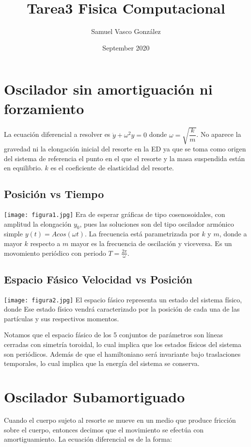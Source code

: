 \documentclass{article}
\title{Tarea3 Fisica Computacional}
\author{Samuel Vasco González}
\date{September 2020}
\begin{document}
\maketitle

\section{Oscilador sin amortiguación ni forzamiento}
\medskip
La ecuación diferencial a resolver es $\ddot{y} + \omega^2 y =0$ donde $\omega=\sqrt{\dfrac{k}{m}}$. No aparece la gravedad ni la elongación inicial del resorte en la ED ya que se toma como origen del sistema de referencia el punto en el que el resorte y la masa suspendida están en equilibrio.
$k$ es el coeficiente de elasticidad del resorte.
\medskip

\subsection{Posición vs Tiempo}
\texttt{[image: figura1.jpg]}
\medskip
Era de esperar gráficas de tipo cosenosoidales, con amplitud la elongación $y_0$, pues las soluciones son del tipo oscilador armónico simple $y(t)=Acos(\omega t)$. La frecuencia está parametrizada por $k$ y $m$, donde a mayor $k$ respecto a $m$ mayor es la frecuencia de oscilación y viceversa. Es un movomiento periódico con periodo $T=\frac{2\pi}{\omega}$. 
\medskip
\subsection{Espacio Fásico Velocidad vs Posición}
\texttt{[image: figura2.jpg]}
\medskip
El espacio fásico representa un estado del sistema físico, donde Ese estado físico vendrá caracterizado por la posición de cada una de las partículas y sus respectivos momentos.

Notamos que el espacio fásico de los 5 conjuntos de parámetros son líneas cerradas con simetría toroidal, lo cual implica que los estados físicos del sistema son periódicos. Además de que el hamiltoniano será invariante bajo traslaciones temporales, lo cual implica que la energía del sistema se conserva.
\medskip
\section{Oscilador Subamortiguado}
\medskip
Cuando el cuerpo sujeto al resorte se mueve en un medio que produce
fricción sobre el cuerpo, entonces decimos que el movimiento se efectúa con
amortiguamiento. La ecuación diferencial es de la forma:
\end{document}
